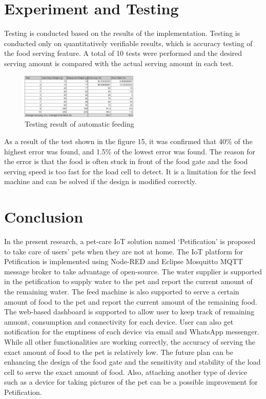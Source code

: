 \documentclass[conference]{IEEEtran}
\begin{document}
\section{Experiment and Testing}
Testing is conducted based on the results of the implementation. Testing is conducted only on quantitatively verifiable results, which is accuracy testing of the food serving feature. A total of 10 tests were performed and the desired serving amount is compared with the actual serving amount in each test.

\begin{figure}[htbp]
\centerline{\includegraphics[width=0.5\textwidth]{./images/Feeding_sheet.jpg}}
\caption{Testing result of automatic feeding}
\label{fig}
\end{figure}

As a result of the test shown in the figure 15, it was confirmed that 40\% of the highest error was found, and 1.5\% of the lowest error was found. The reason for the error is that the food is often stuck in front of the food gate and the food serving speed is too fast for the load cell to detect. It is a limitation for the feed machine and can be solved if the design is modified correctly.

\section{Conclusion}
In the present research, a pet-care IoT solution named ‘Petification’ is proposed to take care of users’ pets when they are not at home. 
The IoT platform for Petification is implemented using Node-RED and Eclipse Mosquitto MQTT message broker to take advantage of open-source.
The water supplier is supported in the petification to supply water to the pet and report the current amount of the remaining water.
The feed machine is also supported to serve a certain amount of food to the pet and report the current amount of the remaining food.
The web-based dashboard is supported to allow user to keep track of remaining amuont, consumption and connectivity for each device.
User can also get notification for the emptiness of each device via email and WhatsApp messenger.
While all other functionalities are working correctly, the accuracy of serving the exact amount of food to the pet is relatively low.
The future plan can be enhancing the design of the food gate and the sensitivity and stability of the load cell to serve the exact amount of food.
Also, attaching another type of device such as a device for taking pictures of the pet can be a possible improvement for Petification.
\end{document}
